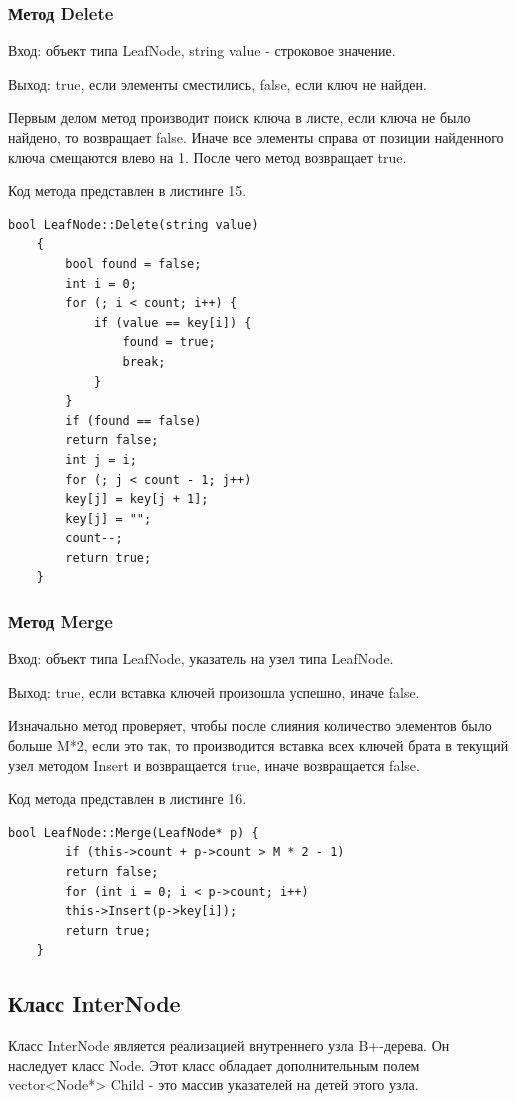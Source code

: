 \documentclass[11pt,a4paper,final]{article} %
\begin{document}
\subsubsection{Метод Delete}
Вход: объект типа LeafNode, string value - строковое значение. \par
Выход: true, если элементы сместились, false, если ключ не найден. \par
Первым делом метод производит поиск ключа в листе, если ключа не было найдено, то возвращает false. Иначе все элементы справа от позиции найденного ключа смещаются влево на 1. После чего метод возвращает true. \par
Код метода представлен в листинге 15.
\begin{lstlisting}[label=Delete, caption = Метод Delete]
	bool LeafNode::Delete(string value)
	{
		bool found = false;
		int i = 0;
		for (; i < count; i++) {
			if (value == key[i]) {
				found = true;
				break;
			}
		}
		if (found == false)
		return false;
		int j = i;
		for (; j < count - 1; j++)
		key[j] = key[j + 1];
		key[j] = "";
		count--;
		return true;
	}
\end{lstlisting}

\subsubsection{Метод Merge}
Вход: объект типа LeafNode, указатель на узел типа LeafNode. \par
Выход: true, если вставка ключей произошла успешно, иначе false. \par
Изначально метод проверяет, чтобы после слияния количество элементов было больше M*2, если это так, то производится вставка всех ключей брата в текущий узел методом Insert и возвращается true, иначе возвращается false.\par
Код метода представлен в листинге 16.
\begin{lstlisting}[label=Merge, caption = Метод Merge]
	bool LeafNode::Merge(LeafNode* p) {
		if (this->count + p->count > M * 2 - 1) 
		return false;
		for (int i = 0; i < p->count; i++)
		this->Insert(p->key[i]);
		return true;
	}
\end{lstlisting}




\subsection{Класс InterNode}
Класс InterNode является реализацией внутреннего узла B+-дерева. Он наследует класс Node. Этот класс обладает дополнительным полем vector<Node*> Child - это массив указателей на детей этого узла.
\end{document}
